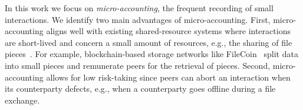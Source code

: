 In this work we focus on \emph{micro-accounting}, the frequent recording of small interactions.
We identify two main advantages of micro-accounting.
First, micro-accounting aligns well with existing shared-resource systems where interactions are short-lived and concern a small amount of resources, e.g., the sharing of file pieces~\cite{seuken2014work}.
For example, blockchain-based storage networks like FileCoin~\cite{benet2018filecoin} split data into small pieces and remunerate peers for the retrieval of pieces.
Second, micro-accounting allows for low risk-taking since peers can abort an interaction when its counterparty defects, e.g., when a counterparty goes offline during a file exchange.








